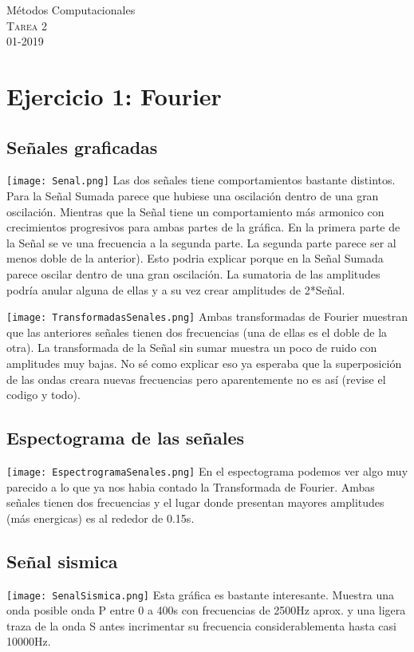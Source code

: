 \documentclass[11pt,letterpaper]{exam}
\begin{document}
\begin{center}
{\Large Métodos Computacionales} \\
\textsc{Tarea 2}\\
01-2019\\
\end{center}

\noindent

\section{Ejercicio 1: Fourier}

\subsection{ Señales graficadas}
\texttt{[image: Senal.png]}
Las dos señales tiene comportamientos bastante distintos. Para la Señal Sumada parece que hubiese una oscilación dentro de una gran oscilación. Mientras que la Señal tiene un comportamiento más armonico con crecimientos progresivos para ambas partes de la gráfica. En la primera parte de la Señal se ve una frecuencia a la segunda parte. La segunda parte parece ser al menos doble de la anterior). Esto podria explicar porque en la Señal Sumada parece oscilar dentro de una gran oscilación. La sumatoria de las amplitudes podría anular alguna de ellas y a su vez crear amplitudes de 2*Señal.

\texttt{[image: TransformadasSenales.png]}
Ambas transformadas de Fourier muestran que las anteriores señales tienen dos frecuencias (una de ellas es el doble de la otra).  La transformada de la Señal sin sumar muestra un poco de ruido con amplitudes muy bajas. No sé como explicar eso ya esperaba que la superposición de las ondas creara nuevas frecuencias pero aparentemente no es así (revise el codigo y todo).

\subsection{ Espectograma de las señales}
\texttt{[image: EspectrogramaSenales.png]}
En el espectograma podemos ver algo muy parecido a lo que ya nos habia contado la Transformada de Fourier. Ambas señales tienen dos frecuencias y el lugar donde presentan mayores amplitudes (más energicas) es al rededor de 0.15s.


\subsection{ Señal sismica}
\texttt{[image: SenalSismica.png]}
Esta gráfica es bastante interesante. Muestra una onda posible onda P entre 0 a 400s con frecuencias de 2500Hz aprox. y una ligera traza de la onda S antes incrimentar su frecuencia considerablementa hasta casi 10000Hz.
\end{document}
